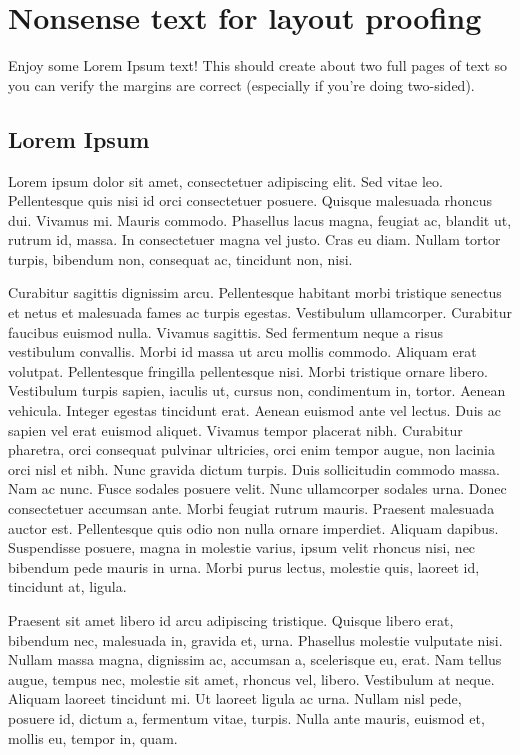 \section{Nonsense text for layout proofing}\label{hello}

Enjoy some Lorem Ipsum text! This should create about two full pages of
text so you can verify the margins are correct (especially if you're
doing two-sided).

\subsection{Lorem Ipsum}\label{lorem-ipsum}

Lorem ipsum dolor sit amet, consectetuer adipiscing elit. Sed vitae leo.
Pellentesque quis nisi id orci consectetuer posuere. Quisque malesuada
rhoncus dui. Vivamus mi. Mauris commodo. Phasellus lacus magna, feugiat
ac, blandit ut, rutrum id, massa. In consectetuer magna vel justo. Cras
eu diam. Nullam tortor turpis, bibendum non, consequat ac, tincidunt
non, nisi.

Curabitur sagittis dignissim arcu. Pellentesque habitant morbi tristique
senectus et netus et malesuada fames ac turpis egestas. Vestibulum
ullamcorper. Curabitur faucibus euismod nulla. Vivamus sagittis. Sed
fermentum neque a risus vestibulum convallis. Morbi id massa ut arcu
mollis commodo. Aliquam erat volutpat. Pellentesque fringilla
pellentesque nisi. Morbi tristique ornare libero. Vestibulum turpis
sapien, iaculis ut, cursus non, condimentum in, tortor. Aenean vehicula.
Integer egestas tincidunt erat. Aenean euismod ante vel lectus. Duis ac
sapien vel erat euismod aliquet. Vivamus tempor placerat nibh. Curabitur
pharetra, orci consequat pulvinar ultricies, orci enim tempor augue, non
lacinia orci nisl et nibh. Nunc gravida dictum turpis. Duis sollicitudin
commodo massa. Nam ac nunc. Fusce sodales posuere velit. Nunc
ullamcorper sodales urna. Donec consectetuer accumsan ante. Morbi
feugiat rutrum mauris. Praesent malesuada auctor est. Pellentesque quis
odio non nulla ornare imperdiet. Aliquam dapibus. Suspendisse posuere,
magna in molestie varius, ipsum velit rhoncus nisi, nec bibendum pede
mauris in urna. Morbi purus lectus, molestie quis, laoreet id, tincidunt
at, ligula.

Praesent sit amet libero id arcu adipiscing tristique. Quisque libero
erat, bibendum nec, malesuada in, gravida et, urna. Phasellus molestie
vulputate nisi. Nullam massa magna, dignissim ac, accumsan a,
scelerisque eu, erat. Nam tellus augue, tempus nec, molestie sit amet,
rhoncus vel, libero. Vestibulum at neque. Aliquam laoreet tincidunt mi.
Ut laoreet ligula ac urna. Nullam nisl pede, posuere id, dictum a,
fermentum vitae, turpis. Nulla ante mauris, euismod et, mollis eu,
tempor in, quam.

